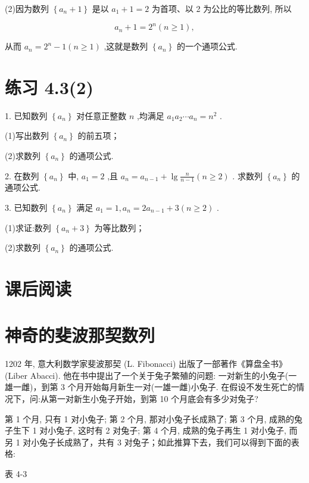 \documentclass[10pt]{article}
\begin{document}
(2)因为数列 \(\left\{  {{a}_{n} + 1}\right\}\) 是以 \({a}_{1} + 1 = 2\) 为首项、以 2 为公比的等比数列, 所以

\[
{a}_{n} + 1 = {2}^{n}\left( {n \geq  1}\right) ,
\]

从而 \({a}_{n} = {2}^{n} - 1\left( {n \geq  1}\right)\) ,这就是数列 \(\left\{  {a}_{n}\right\}\) 的一个通项公式.

\section*{练习 4.3(2)}

1. 已知数列 \(\left\{  {a}_{n}\right\}\) 对任意正整数 \(n\) ,均满足 \({a}_{1}{a}_{2}\cdots {a}_{n} = {n}^{2}\) .

(1)写出数列 \(\left\{  {a}_{n}\right\}\) 的前五项；

(2)求数列 \(\left\{  {a}_{n}\right\}\) 的通项公式.

2. 在数列 \(\left\{  {a}_{n}\right\}\) 中, \({a}_{1} = 2\) ,且 \({a}_{n} = {a}_{n - 1} + \lg \frac{n}{n - 1}\left( {n \geq  2}\right)\) . 求数列 \(\left\{  {a}_{n}\right\}\) 的通项公式.

3. 已知数列 \(\left\{  {a}_{n}\right\}\) 满足 \({a}_{1} = 1,{a}_{n} = 2{a}_{n - 1} + 3\left( {n \geq  2}\right)\) .

(1)求证:数列 \(\left\{  {{a}_{n} + 3}\right\}\) 为等比数列；

(2)求数列 \(\left\{  {a}_{n}\right\}\) 的通项公式.

\section*{课后阅读}

\section*{神奇的斐波那契数列}

1202 年, 意大利数学家斐波那契 (L. Fibonacci) 出版了一部著作《算盘全书》(Liber Abacci). 他在书中提出了一个关于兔子繁殖的问题: 一对新生的小兔子(一雄一雌)，到第 3 个月开始每月新生一对(一雄一雌)小兔子. 在假设不发生死亡的情况下，问:从第一对新生小兔子开始，到第 10 个月底会有多少对兔子?

第 1 个月, 只有 1 对小兔子; 第 2 个月, 那对小兔子长成熟了; 第 3 个月, 成熟的兔子生下 1 对小兔子, 这时有 2 对兔子; 第 4 个月, 成熟的兔子再生 1 对小兔子, 而另 1 对小兔子长成熟了，共有 3 对兔子；如此推算下去，我们可以得到下面的表格:

表 4-3
\end{document}
